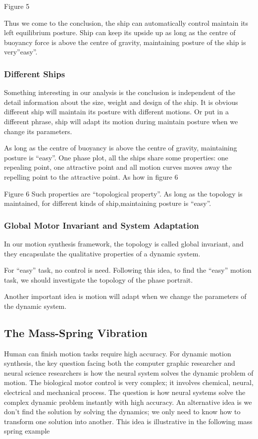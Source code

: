 Figure 5

Thus we come to the conclusion, the ship can automatically control maintain its left equilibrium posture. 
 Ship can keep its upside up as long as the centre of buoyancy force is above the centre of gravity, 
maintaining posture of the ship is very”easy”.


\subsubsection*{Different Ships} 
Something interesting in our analysis is the conclusion is independent of the detail information about the size, weight and design of the ship. 
It is obvious different ship will maintain its posture with different motions. 
Or put in a different phrase, ship will adapt its motion during maintain posture when we change its parameters.

As long as the centre of buoyancy is above the centre of gravity, maintaining posture is “easy”.
One phase plot, all the ships share some properties: one repealing point, one attractive point and all motion curves moves away the repelling point to the attractive point. As how in figure 6

Figure 6
Such properties are “topological property”.
As long as the topology is maintained, for different kinds of ship,maintaining posture is “easy”.


\subsubsection*{Global Motor Invariant and System Adaptation}
In our motion synthesis framework, the topology is called global invariant, and they encapsulate the qualitative properties of a dynamic system.

For “easy” task, no control is need.
Following this idea, to find the “easy” motion task, we should investigate the topology of the phase portrait.

Another important idea is motion will adapt when we change the parameters of the dynamic system.


\subsection{The Mass-Spring Vibration}
Human can finish motion tasks require high accuracy.
For dynamic motion synthesis, the key question facing both the computer graphic researcher and neural science researchers is how the neural system solves the dynamic problem of motion. 
The biological motor control is very complex; it involves chemical, neural, electrical and mechanical process. 
The question is how neural systems solve the complex dynamic problem instantly with high accuracy.
An alternative idea is we don’t find the solution by solving the dynamics; we only need to know how to transform one solution into another.
This idea is illustrative in the following mass spring example

